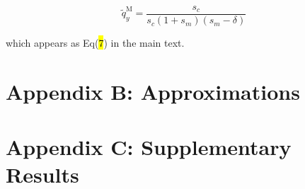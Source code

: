 \documentclass{article}
\begin{document}
\begin{equation} \label{eq:mInvDelta-threshold}
	\tilde{q}_y^{\text{M}} = \frac{s_c} {s_c (1 + s_m)(s_m - \delta)}
\end{equation}

\noindent which appears as Eq(\hl{7}) in the main text.



\noindent 

\newpage{}
\section{Appendix B: Approximations} \label{sec:Approximations}
\renewcommand{\theequation}{B\arabic{equation}}
\setcounter{equation}{0}
\renewcommand{\thefigure}{B\arabic{figure}}
\setcounter{figure}{0}





\newpage{}
\section*{Appendix C: Supplementary Results}
\renewcommand{\theequation}{D\arabic{equation}}
\setcounter{equation}{0}
\renewcommand{\thefigure}{D\arabic{figure}}
\setcounter{figure}{0}

\end{document}
